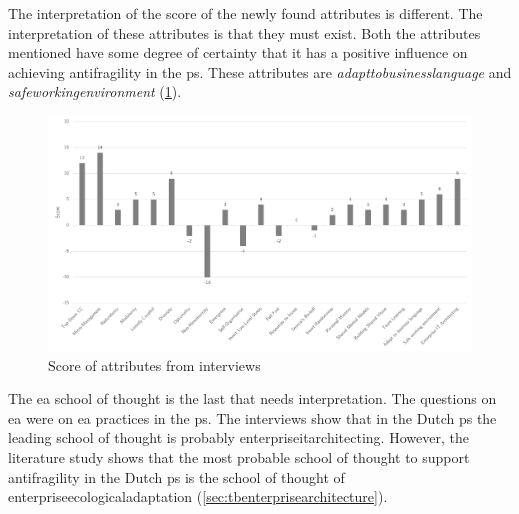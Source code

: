 The interpretation of the score of the newly found \glspl{attribute} is different. The interpretation of these \glspl{attribute} is that they must exist. Both the \glspl{attribute} mentioned have some degree of certainty that it has a positive influence on achieving \gls{antifragility} in the \gls{ps}. These attributes are \textit{\gls{adapttobusinesslanguage}} and \textit{\gls{safeworkingenvironment}} (\cref{fig:scoreofattributes}).
\begin{figure}[H]
	\centering
	\includegraphics[width=\textwidth]{images/scoreofattributes}
	\caption[Score of attributes from interviews]{Score of attributes from interviews}
	\label{fig:scoreofattributes}
\end{figure}
The \gls{ea} school of thought is the last that needs interpretation. The questions on \gls{ea} were on \gls{ea} practices in the \gls{ps}. The interviews show that in the Dutch \gls{ps} the leading school of thought is probably \gls{enterpriseitarchitecting}. However, the literature study shows that the most probable school of thought to support \gls{antifragility} in the Dutch \gls{ps} is the school of thought of \gls{enterpriseecologicaladaptation} (\cref{sec:tbenterprisearchitecture}).

